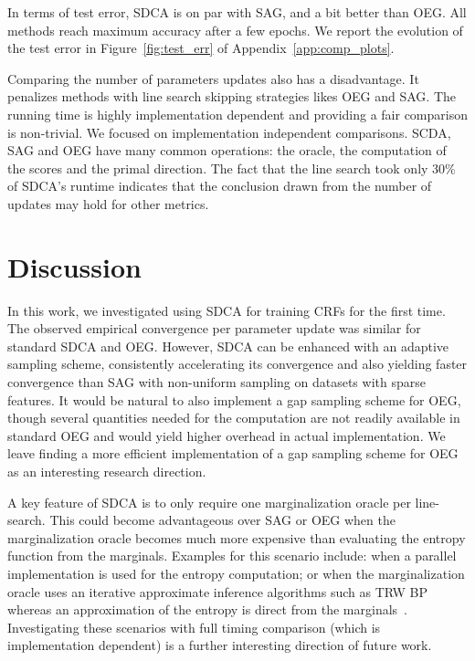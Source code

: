 In terms of test error, SDCA is on par with SAG, and a bit better than OEG.
All methods reach maximum accuracy after a few epochs.
We report the evolution of the test error in Figure~\ref{fig:test_err} of Appendix~\ref{app:comp_plots}.

Comparing the number of parameters updates also has a disadvantage.
It penalizes methods with line search skipping strategies likes OEG and SAG.
The running time is highly implementation dependent and providing a fair comparison is non-trivial.
We focused on implementation independent comparisons.
SCDA, SAG and OEG have many common operations: the oracle, the computation of the scores and the primal  direction.
The fact that the line search took only 30\% of SDCA's runtime indicates that the conclusion drawn from the number of updates may hold for other metrics.

\section{Discussion} \label{sec:discussion}

In this work, we investigated using SDCA for training CRFs for the first time.
The observed empirical convergence per parameter update was similar for standard SDCA and OEG.
However, SDCA can be enhanced with an adaptive sampling scheme, consistently accelerating its convergence and also yielding faster convergence than SAG with non-uniform sampling on datasets with sparse features.
It would be natural to also implement a gap sampling scheme for OEG, though several quantities needed for the computation are not readily available in standard OEG and would yield higher overhead in actual implementation.
We leave finding a more efficient implementation of a gap sampling scheme for OEG as an interesting research direction.

A key feature of SDCA is to only require one marginalization oracle per line-search.
This could become advantageous over SAG or OEG when the marginalization oracle becomes much more expensive than evaluating the entropy function from the marginals.
Examples for this scenario include: when a parallel implementation is used for the entropy computation; or when the marginalization oracle uses an iterative approximate inference algorithms such as TRW BP whereas an approximation of the entropy is direct from the marginals~\citep{kirshnan15barrierFW}.
Investigating these scenarios with full timing comparison (which is implementation dependent) is a further interesting direction of future work.

